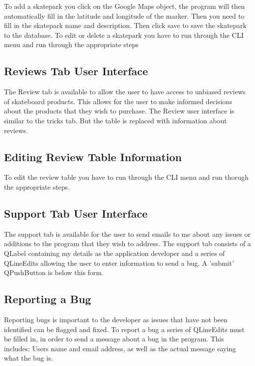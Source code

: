 To add a skatepark you click on the Google Maps object, the program will then automatically fill in the latitude and longitude of the marker. Then you need to fill in the skatepark name and description. Then click save to save the skatepark to the database. To edit or delete a skatepark you have to run through the CLI menu and run through the appropriate steps



\subsection{Reviews Tab User Interface}

The Review tab is available to allow the user to have access to unbiased reviews of skateboard products. This allows for the user to make informed decisions about the products that they wish to purchase. The Review user interface is similar to the tricks tab. But the table is replaced with information about reviews.

\subsection{Editing Review Table Information}

To edit the review table you have to run through the CLI menu and run thorugh the appropriate steps.



\subsection{Support Tab User Interface}

The support tab is available for the user to send emails to me about any issues or additions to the program that they wish to address. The support tab consists of a QLabel containing my details as the application developer and a series of QLineEdits allowing the user to enter information to send a bug. A 'submit' QPushButton is below this form.

\subsection{Reporting a Bug}

Reporting bugs is important to the developer as issues that have not been identified can be flagged and fixed. To report a bug a series of QLineEdits must be filled in, in order to send a message about a bug in the program. This includes: Users name and email address, as well as the actual message saying what the bug is. 








